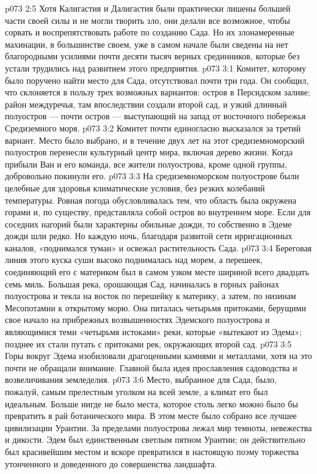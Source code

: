\vs p073 2:5 \pc Хотя Калигастия и Далигастия были практически лишены большей части своей силы и не могли творить зло, они делали все возможное, чтобы сорвать и воспрепятствовать работе по созданию Сада. Но их злонамеренные махинации, в большинстве своем, уже в самом начале были сведены на нет благородными усилиями почти десяти тысяч верных срединников, которые без устали трудились над развитием этого предприятия.
\vs p073 3:1 Комитет, которому было поручено найти место для Сада, отсутствовал почти три года. Он сообщил, что склоняется в пользу трех возможных вариантов: остров в Персидском заливе; район междуречья, там впоследствии создали второй сад, и узкий длинный полуостров --- почти остров --- выступающий на запад от восточного побережья Средиземного моря.
\vs p073 3:2 Комитет почти единогласно высказался за третий вариант. Место было выбрано, и в течение двух лет на этот средиземноморский полуостров перенесли культурный центр мира, включая дерево жизни. Когда прибыли Ван и его команда, все жители полуострова, кроме одной группы, добровольно покинули его.
\vs p073 3:3 \pc На средиземноморском полуострове были целебные для здоровья климатические условия, без резких колебаний температуры. Ровная погода обусловливалась тем, что область была окружена горами и, по существу, представляла собой остров во внутреннем море. Если для соседних нагорий были характерны обильные дожди, то собственно в Эдеме дожди шли редко. Но каждую ночь, благодаря развитой сети ирригационных каналов, «поднимался туман» и освежал растительность Сада.
\vs p073 3:4 Береговая линия этого куска суши высоко поднималась над морем, а перешеек, соединяющий его с материком был в самом узком месте шириной всего двадцать семь миль. Большая река, орошающая Сад, начиналась в горных районах полуострова и текла на восток по перешейку к материку, а затем, по низинам Месопотамии к открытому морю. Она питалась четырьмя притоками, берущими свое начало на прибрежных возвышенностях Эдемского полуострова и являющимися теми «четырьмя истоками» реки, которые «вытекают из Эдема»; позднее их стали путать с притоками рек, окружающих второй сад.
\vs p073 3:5 Горы вокруг Эдема изобиловали драгоценными камнями и металлами, хотя на это почти не обращали внимание. Главной была идея прославления садоводства и возвеличивания земледелия.
\vs p073 3:6 Место, выбранное для Сада, было, пожалуй, самым прелестным уголком на всей земле, а климат его был идеальным. Больше нигде не было места, которое столь легко можно было бы превратить в рай ботанического мира. В этом месте было собрано все лучшее цивилизации Урантии. За пределами полуострова лежал мир темноты, невежества и дикости. Эдем был единственным светлым пятном Урантии; он действительно был красивейшим местом и вскоре превратился в настоящую поэму торжества утонченного и доведенного до совершенства ландшафта.
